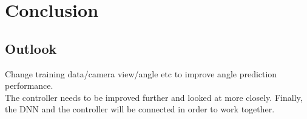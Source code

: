 \documentclass[10pt,a4paper,twoside,journal]{IEEEtran}
\begin{document}
\section{Conclusion}
\label{sc:conclusion}

\subsection{Outlook}
\label{ssc:outlook}
Change training data/camera view/angle etc to improve angle prediction performance. \\
The controller needs to be improved further and looked at more closely. Finally, the DNN and the controller will be connected in order to work together.




\end{document}
